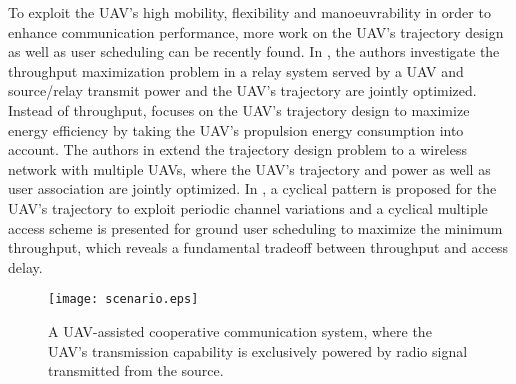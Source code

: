 \documentclass[12pt, draftclsnofoot, onecolumn]{IEEEtran}
\begin{document}
To exploit the UAV’s high mobility, flexibility and manoeuvrability in order to enhance communication performance, more work on the UAV's trajectory design as well as user scheduling can be recently found. In \cite{7572068}, the authors investigate the throughput maximization problem in a relay system served by a UAV and source/relay transmit power and the UAV's trajectory are jointly optimized. Instead of throughput, \cite{7888557} focuses on the UAV's trajectory design to maximize energy efficiency by taking the UAV's propulsion energy consumption into account. The authors in \cite{DBLP:journals/corr/WuZZ17b} extend the trajectory design problem to a wireless network with multiple UAVs, where the UAV's trajectory and power as well as user association are jointly optimized. In \cite{7556368}, a cyclical pattern is proposed for the UAV's trajectory to exploit periodic channel variations and a cyclical multiple access scheme is presented for ground user scheduling to maximize the minimum throughput, which reveals a fundamental tradeoff between throughput and access delay. 

\begin{figure}
\centering
 \texttt{[image: scenario.eps]}
\caption{A UAV-assisted cooperative communication system, where the UAV's transmission capability is exclusively powered by radio signal transmitted from the source.}
\label{fig:scenario}
\vspace*{-0.15in}
\end{figure}
\end{document}
